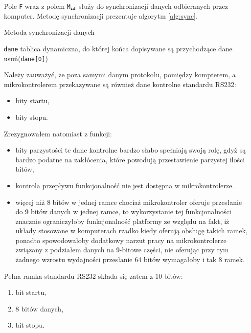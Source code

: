 Pole \texttt{F} wraz z polem \texttt{M$_\textrm{\texttt{id}}$} służy do synchronizacji danych odbieranych przez komputer. Metodę synchronizacji prezentuje algorytm \ref{alg:sync}.

\begin{algorithm}
\caption{Metoda synchronizacji danych}
\label{alg:sync}
\begin{algorithmic}[1]
  \REQUIRE \texttt{dane} \ppauza tablica dynamiczna, do której końca dopisywane są przychodzące dane
      \STATE usuń(\texttt{dane[0]})
    \ENDWHILE
  \ENDWHILE
\end{algorithmic}
\end{algorithm}

Należy zauważyć, że poza samymi danym protokołu, pomiędzy kompterem, a mikrokontrolerem przekazywane są również dane kontrolne standardu RS232:
\begin{itemize}
  \item bity startu,
  \item bity stopu.
\end{itemize}

Zrezygnowałem natomiast z funkcji:
\begin{itemize}
 \item bity parzystości \ppauza te dane kontrolne bardzo słabo spełniają swoją rolę, gdyż są bardzo podatne na zakłócenia, które powodują przestawienie parzystej ilości bitów,
 \item kontrola przepływu \ppauza funkcjonalność nie jest dostępna w mikrokontrolerze.
 \item więcej niż 8 bitów w jednej ramce \ppauza chociaż mikrokontroler oferuje przesłanie do 9 bitów danych w jednej ramce, to wykorzystanie tej funkcjonalności znacznie ograniczyłoby funkcjonalność platformy ze względu na fakt, iż układy stosowane w komputerach rzadko kiedy oferują obsługę takich ramek, ponadto spowodowałoby dodatkowy narzut pracy na mikrokontrolerze związany z podziałem danych na 9-bitowe części, nie oferując przy tym żadnego wzrostu wydajności \ppauza przesłanie 64 bitów wymagałoby i tak 8 ramek.
\end{itemize}

Pełna ramka standardu RS232 składa się zatem z 10 bitów:
\begin{enumerate}
 \item bit startu,
 \item 8 bitów danych,
 \item bit stopu.
\end{enumerate}